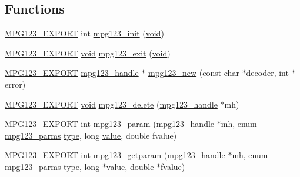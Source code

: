\subsection*{Functions}
\begin{DoxyCompactItemize}
\item 
\mbox{\hyperlink{mpg123_8h_a2ba98cfba3f760879df70e755b2a61cc}{M\+P\+G123\+\_\+\+E\+X\+P\+O\+RT}} int \mbox{\hyperlink{group__mpg123__init_gad59b5dc08fb7551ef5ec085906a85604}{mpg123\+\_\+init}} (\mbox{\hyperlink{_s_d_l__opengles2__gl2ext_8h_ae5d8fa23ad07c48bb609509eae494c95}{void}})
\item 
\mbox{\hyperlink{mpg123_8h_a2ba98cfba3f760879df70e755b2a61cc}{M\+P\+G123\+\_\+\+E\+X\+P\+O\+RT}} \mbox{\hyperlink{_s_d_l__opengles2__gl2ext_8h_ae5d8fa23ad07c48bb609509eae494c95}{void}} \mbox{\hyperlink{group__mpg123__init_gac73c78104d6525100aa4e1c62705c6be}{mpg123\+\_\+exit}} (\mbox{\hyperlink{_s_d_l__opengles2__gl2ext_8h_ae5d8fa23ad07c48bb609509eae494c95}{void}})
\item 
\mbox{\hyperlink{mpg123_8h_a2ba98cfba3f760879df70e755b2a61cc}{M\+P\+G123\+\_\+\+E\+X\+P\+O\+RT}} \mbox{\hyperlink{group__mpg123__init_ga6728e2839a395f3a07d4514da659faca}{mpg123\+\_\+handle}} $\ast$ \mbox{\hyperlink{group__mpg123__init_ga1413635a4b699acdf3b19bd9d2257557}{mpg123\+\_\+new}} (const char $\ast$decoder, int $\ast$error)
\item 
\mbox{\hyperlink{mpg123_8h_a2ba98cfba3f760879df70e755b2a61cc}{M\+P\+G123\+\_\+\+E\+X\+P\+O\+RT}} \mbox{\hyperlink{_s_d_l__opengles2__gl2ext_8h_ae5d8fa23ad07c48bb609509eae494c95}{void}} \mbox{\hyperlink{group__mpg123__init_ga1607278690c3dea7affb906615af12ad}{mpg123\+\_\+delete}} (\mbox{\hyperlink{group__mpg123__init_ga6728e2839a395f3a07d4514da659faca}{mpg123\+\_\+handle}} $\ast$mh)
\item 
\mbox{\hyperlink{mpg123_8h_a2ba98cfba3f760879df70e755b2a61cc}{M\+P\+G123\+\_\+\+E\+X\+P\+O\+RT}} int \mbox{\hyperlink{group__mpg123__init_gad2c81c9b8abeccd5e0e8a01e6744d806}{mpg123\+\_\+param}} (\mbox{\hyperlink{group__mpg123__init_ga6728e2839a395f3a07d4514da659faca}{mpg123\+\_\+handle}} $\ast$mh, enum \mbox{\hyperlink{group__mpg123__init_ga73a8ff3363028b89afc72b3ea032b9cb}{mpg123\+\_\+parms}} \mbox{\hyperlink{_s_d_l__opengl_8h_ad5ddf6fca7b585646515660e810e0188}{type}}, long \mbox{\hyperlink{_s_d_l__opengl__glext_8h_a8ad81492d410ff2ac11f754f4042150f}{value}}, double fvalue)
\item 
\mbox{\hyperlink{mpg123_8h_a2ba98cfba3f760879df70e755b2a61cc}{M\+P\+G123\+\_\+\+E\+X\+P\+O\+RT}} int \mbox{\hyperlink{group__mpg123__init_ga2b742bb1eecc9d29a09aa9a7f69b52af}{mpg123\+\_\+getparam}} (\mbox{\hyperlink{group__mpg123__init_ga6728e2839a395f3a07d4514da659faca}{mpg123\+\_\+handle}} $\ast$mh, enum \mbox{\hyperlink{group__mpg123__init_ga73a8ff3363028b89afc72b3ea032b9cb}{mpg123\+\_\+parms}} \mbox{\hyperlink{_s_d_l__opengl_8h_ad5ddf6fca7b585646515660e810e0188}{type}}, long $\ast$\mbox{\hyperlink{_s_d_l__opengl__glext_8h_a8ad81492d410ff2ac11f754f4042150f}{value}}, double $\ast$fvalue)

\end{DoxyCompactItemize}
